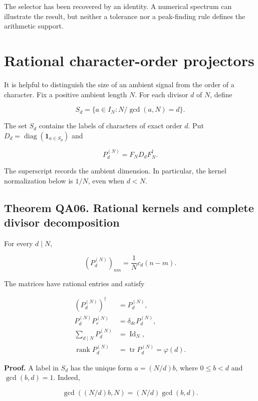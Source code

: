 The selector has been recovered by an identity. A numerical spectrum can
illustrate the result, but neither a tolerance nor a peak-finding rule
defines the arithmetic support.

\hypertarget{rational-character-order-projectors}{%
\section{Rational character-order
projectors}\label{rational-character-order-projectors}}

It is helpful to distinguish the size of an ambient signal from the
order of a character. Fix a positive ambient length \(N\). For each
divisor \(d\) of \(N\), define

\[
S_d=\{a\in I_N:N/\gcd(a,N)=d\}.
\]

The set \(S_d\) contains the labels of characters of exact order \(d\).
Put \(D_d=\operatorname{diag}(\mathbf1_{a\in S_d})\) and

\[
P_d^{(N)}=F_ND_dF_N^\dagger.
\]

The superscript records the ambient dimension. In particular, the kernel
normalization below is \(1/N\), even when \(d<N\).

\hypertarget{theorem-qa06.-rational-kernels-and-complete-divisor-decomposition}{%
\subsection*{Theorem QA06. Rational kernels and complete divisor
decomposition}\label{theorem-qa06.-rational-kernels-and-complete-divisor-decomposition}}

For every \(d\mid N\),

\[
\boxed{(P_d^{(N)})_{nm}=\frac1N c_d(n-m).}
\]

The matrices have rational entries and satisfy

\[
\begin{aligned}
(P_d^{(N)})^\dagger&=P_d^{(N)},\\
P_d^{(N)}P_e^{(N)}&=\delta_{de}P_d^{(N)},\\
\sum_{d\mid N}P_d^{(N)}&=\operatorname{Id}_N,\\
\operatorname{rank}P_d^{(N)}&=\operatorname{tr}P_d^{(N)}=\varphi(d).
\end{aligned}
\]

\textbf{Proof.} A label in \(S_d\) has the unique form \(a=(N/d)b\),
where \(0\le b<d\) and \(\gcd(b,d)=1\). Indeed,

\[
\gcd((N/d)b,N)=(N/d)\gcd(b,d).
\]

